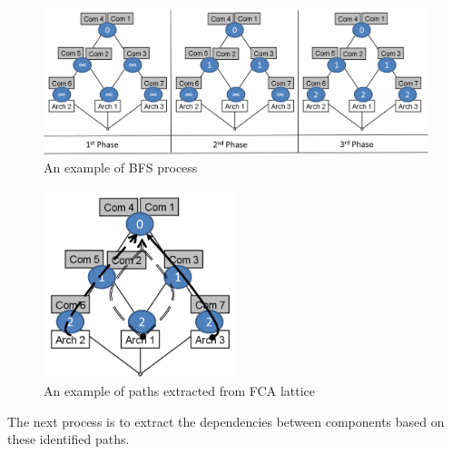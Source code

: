 \documentclass[graybox]{svmult}
\begin{document}
\begin{figure} [h]
\centering
\includegraphics[width=\textwidth]{figs/bfsExample.png}
\caption{An example of BFS process}
\label{fig:BFSexample}
\end{figure}


\begin{figure} [h]
\centering
\includegraphics[width=0.5\textwidth]{figs/FCA_Arch_path.png}
\caption{An example of paths extracted from FCA lattice}
\label{fig:FCA_Arch_Path}
\end{figure}

The next process is to extract the dependencies between components based on these identified paths.
\end{document}
